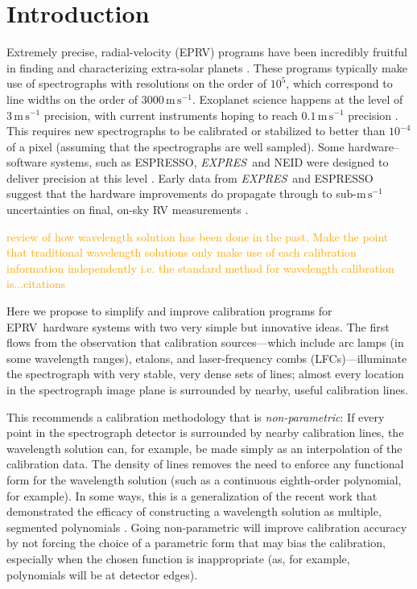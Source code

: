 \documentclass[12pt, onecolumn]{aastex63}
\newcommand{\lz}[1]{\textcolor{orange}{#1}}
\newcommand{\project}[1]{\textsl{#1}}
\newcommand{\acronym}[1]{{\small{#1}}}
\newcommand{\expres}{\project{\acronym{EXPRES}}}
\newcommand{\eprv}{\acronym{EPRV}}
\newcommand{\lfc}{\acronym{LFC}}
\newcommand{\mps}{\mathrm{m\,s^{-1}}}
\begin{document}

\section{Introduction} 
Extremely precise, radial-velocity (\eprv) programs have been incredibly fruitful in finding and characterizing extra-solar planets \citep{mayor2011, bonfils2013, plavchan2015, butler2017}.  These programs typically make use of spectrographs with resolutions on the order of $10^5$, which correspond to line widths on the order of $3000\,\mps$.  Exoplanet science happens at the level of $3\,\mps$ precision, with current instruments hoping to reach $0.1\,\mps$ precision \citep{fischer2016}.  This requires new spectrographs to be calibrated or stabilized to better than $10^{-4}$ of a pixel (assuming that the spectrographs are well sampled).    Some hardware--software systems, such as ESPRESSO, \expres\, and NEID were designed to deliver precision at this level \citep{pepe2013,  jurgenson2016, neid}.  Early data from \expres\ and ESPRESSO suggest that the hardware improvements do propagate through to sub-$\mps$ uncertainties on final, on-sky RV measurements \citep{blackman2020, petersburg2020, pepe2020}.

\lz{review of how wavelength solution has been done in the past.  Make the point that traditional wavelength solutions only make use of each calibration information independently
i.e. the standard method for wavelength calibration is...citations}

Here we propose to simplify and improve calibration programs for \eprv\ hardware systems with two very simple but innovative ideas.  The first flows from the observation that calibration sources---which include arc lamps (in some wavelength ranges), etalons, and laser-frequency combs (\lfc s)---illuminate the spectrograph with very stable, very dense sets of lines; almost every location in the spectrograph image plane is surrounded by nearby, useful calibration lines.

This recommends a calibration methodology that is \emph{non-parametric}:  If every point in the spectrograph detector is surrounded by nearby calibration lines, the wavelength solution can, for example, be made simply as an interpolation of the calibration data.  The density of lines removes the need to enforce any functional form for the wavelength solution (such as a continuous eighth-order polynomial, for example).  In some ways, this is a generalization of the recent work that demonstrated the efficacy of constructing a wavelength solution as multiple, segmented polynomials \citep{milakovic2020}.  Going non-parametric will improve calibration accuracy by not forcing the choice of a parametric form that may bias the calibration, especially when the chosen function is inappropriate (as, for example, polynomials will be at detector edges).
\end{document}
